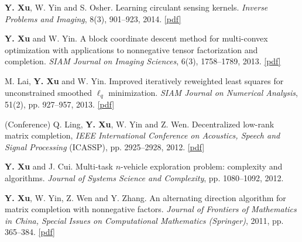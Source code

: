 \documentclass[letterpaper]{article}
\begin{document}
\begin{etaremune}
\item \textbf{Y. Xu}, W. Yin and S. Osher. Learning circulant sensing kernels. \emph{Inverse Problems and Imaging}, 8(3), 901--923, 2014. \href{http://www.aimsciences.org/journals/pdfs.jsp?paperID=10290&mode=full}{[pdf]}
\item \textbf{Y. Xu} and W. Yin. A block coordinate descent method for multi-convex optimization with applications to nonnegative tensor factorization and completion. \emph{SIAM Journal on Imaging Sciences}, 6(3), 1758--1789, 2013. \href{http://epubs.siam.org/doi/abs/10.1137/120887795}{[pdf]}
\item M. Lai, \textbf{Y. Xu} and W. Yin. Improved iteratively reweighted least squares for unconstrained smoothed $\ell_q$ minimization. \emph{SIAM Journal on Numerical Analysis}, 51(2), pp. 927--957, 2013.
\href{http://epubs.siam.org/doi/abs/10.1137/110840364}{[pdf]}
\item (Conference) Q. Ling, \textbf{Y. Xu}, W. Yin and Z. Wen. Decentralized low-rank matrix completion, {\em IEEE International Conference on Acoustics, Speech and Signal Processing} (ICASSP), pp. 2925--2928, 2012.
\href{http://ieeexplore.ieee.org/xpl/login.jsp?tp=&arnumber=6288528&url=http%
Fieeexplore.ieee.org%
\item \textbf{Y. Xu} and J. Cui. Multi-task $n$-vehicle exploration problem: complexity and algorithms. \emph{Journal of Systems Science and Complexity}, pp. 1080--1092, 2012.
\item \textbf{Y. Xu}, W. Yin, Z. Wen and Y. Zhang. An alternating direction algorithm for matrix completion with nonnegative factors. {\em Journal of Frontiers of Mathematics in China, Special Issues on Computational Mathematics (Springer)}, 2011, pp. 365--384. \href{http://link.springer.com/article/10.1007/s11464-012-0194-5}{[pdf]}
\end{etaremune}
\end{document}
